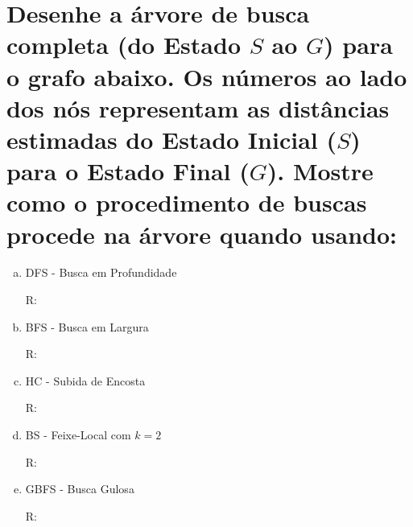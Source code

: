 \documentclass[paper=a4, fontsize=11pt]{scrartcl} %
\begin{document}
    
    \section{Desenhe a árvore de busca completa (do Estado $S$ ao $G$) para o grafo abaixo. Os números ao lado dos nós representam as distâncias estimadas do Estado Inicial ($S$) para o Estado Final ($G$). Mostre como o procedimento de buscas procede na árvore quando usando:}
    

    \begin{enumerate}[(a)]
        \item DFS - Busca em Profundidade
        \par R: 

        \item BFS - Busca em Largura
        \par R:

        \item HC - Subida de Encosta
        \par R:

        \item BS - Feixe-Local com $k=2$
        \par R:

        \item GBFS - Busca Gulosa
        \par R:

    \end{enumerate}


    
\end{document}
